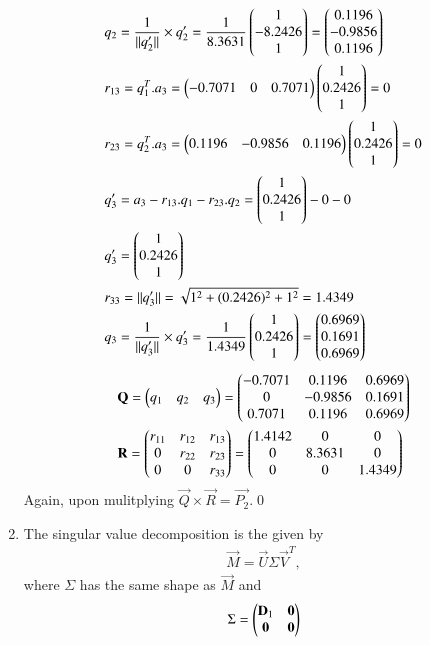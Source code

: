 \documentclass[journal,12pt,twocolumn]{IEEEtran}
\renewcommand\thesection{\arabic{section}}
\begin{document}
\begin{enumerate}[label=\thesection.\arabic*.,ref=\thesection.\theenumi]
\begin{align*}
& q_2=\frac{1}{||q_2'||}\times q_2'=\frac{1}{8.3631}\begin{pmatrix}1 \\-8.2426\\ 1\end{pmatrix}=\begin{pmatrix}0.1196\\ -0.9856\\0.1196\end{pmatrix}\\
& r_{13}=q_1^T.a_3=\begin{pmatrix}-0.7071 & 0 & 0.7071 \end{pmatrix} \begin{pmatrix}1\\0.2426\\ 1\end{pmatrix}=0\\
& r_{23}=q_2^T.a_3=\begin{pmatrix}0.1196& -0.9856& 0.1196\end{pmatrix} \begin{pmatrix}1\\0.2426\\ 1\end{pmatrix}=0\\
&q_3'=a_3-r_{13}.q_1-r_{23}.q_2=\begin{pmatrix}1\\0.2426\\ 1\end{pmatrix}-0-0\\
&q_3'=\begin{pmatrix}1\\0.2426\\ 1\end{pmatrix}\\
& r_{33}=||q_3'||=\sqrt{1^2+(0.2426)^2+1^2}=1.4349\\
& q_3=\frac{1}{||q_3'||}\times q_3'=\frac{1}{1.4349}\begin{pmatrix}1 \\0.2426\\ 1\end{pmatrix}=\begin{pmatrix}0.6969\\ 0.1691\\0.6969\end{pmatrix}
\end{align*}
\begin{align*}
&\mathbf{Q}=\begin{pmatrix}q_1 & q_2 &q_3\end{pmatrix}=\begin{pmatrix}-0.7071 & 0.1196 & 0.6969 \\ 0 & -0.9856 & 0.1691\\ 0.7071 & 0.1196 & 0.6969\end{pmatrix}\\
& \mathbf{R}=\begin{pmatrix}r_{11} & r_{12} & r_{13}\\ 0 & r_{22} & r_{23}\\0 & 0& r_{33}\end{pmatrix}=\begin{pmatrix}1.4142 & 0 & 0\\ 0 & 8.3631 & 0\\0 & 0 & 1.4349\end{pmatrix}
\end{align*}
Again, upon mulitplying $\vec{Q}\times\vec{R}=\vec{P_2}$.\qed
\item The singular value decomposition is the given by
\begin{align}
\vec{M} = \vec{U} \Sigma \vec{V}^T,
\end{align}
where $\Sigma$ has the same shape as $\vec{M}$ and
\begin{align}
\Sigma = \begin{pmatrix}\mathbf{D}_1 & \mathbf{0} \\ \mathbf{0} & \mathbf{0}\end{pmatrix}
\end{align}

\end{enumerate}
\end{document}
